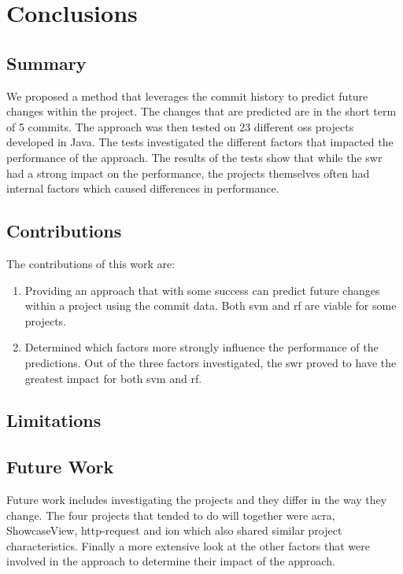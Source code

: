 \chapter{Conclusions}
\label{chap:conclusions}

\section{Summary}

We proposed a method that leverages the commit history to predict future changes within the project. The changes that are predicted are in the short term of 5 commits. The approach was then tested on 23 different \gls{oss} projects developed in Java. The tests investigated the different factors that impacted the performance of the approach. The results of the tests show that while the \gls{swr} had a strong impact on the performance, the projects themselves often had internal factors which caused differences in performance.

\section{Contributions}

The contributions of this work are:
\begin{enumerate}
\item Providing an approach that with some success can predict future changes within a project using the commit data. Both \gls{svm} and \gls{rf} are viable for some projects.
\item Determined which factors more strongly influence the performance of the predictions. Out of the three factors investigated, the \gls{swr} proved to have the greatest impact for both \gls{svm} and \gls{rf}.
\end{enumerate}

\section{Limitations}

\section{Future Work}

Future work includes investigating the projects and they differ in the way they change. The four projects that tended to do will together were acra, ShowcaseView, http-request and ion which also shared similar project characteristics. Finally a more extensive look at the other factors that were involved in the approach to determine their impact of the approach.

